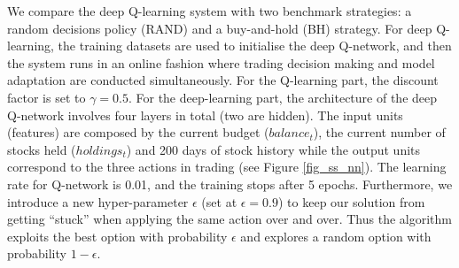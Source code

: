\documentclass[12pt, authoryear]{elsarticle}
\begin{document}
We compare the deep Q-learning system with two benchmark strategies: a random decisions policy (RAND) and a buy-and-hold (BH) strategy. For deep Q-learning, the training datasets are used to initialise the deep Q-network, and then the system runs in an online fashion where trading decision making and model adaptation are conducted simultaneously. For the Q-learning part, the discount factor is set to $\gamma =  0.5$. For the deep-learning part, the architecture of the deep Q-network involves four layers in total (two are hidden). The input units (features) are composed by the current budget ($balance_{t}$), the current number of stocks held ($holdings_{t}$) and 200 days of stock history while the output units correspond to the three actions in trading (see Figure \ref{fig_ss_nn}). The learning rate for Q-network is 0.01, and the training stops after 5 epochs. Furthermore, we introduce a new hyper-parameter $\epsilon$ (set at $\epsilon = 0.9$) to keep our solution from getting ``stuck'' when applying the same action over and over. Thus the algorithm exploits the best option with probability $\epsilon$ and explores a random option with probability $1 - \epsilon$.
	
\end{document}
